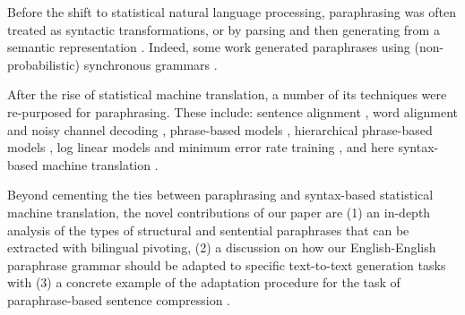 \documentclass[11pt]{article}
\begin{document}
Before the shift to statistical natural language processing,
paraphrasing was often treated as syntactic transformations, or by
parsing and then generating from a semantic representation
\cite{mckeown:1979:ACL,Muraki1982,Meteer1988,Shemtov1996,Yamamoto2002}.
Indeed, some work generated paraphrases using (non-probabilistic)
synchronous grammars
\cite{Shieber1990,Dras1997,Dras1999,Kozlowski2003}.

After the rise of statistical machine translation, a number of its
techniques were re-purposed for paraphrasing.  These include: sentence
alignment \cite{Gale1993,Barzilay2003a}, word alignment and noisy
channel decoding \cite{Brown1990,Quirk2004}, phrase-based models
\cite{Koehn2003,Callison-Burch2005}, hierarchical phrase-based models
\cite{Chiang2005,Madnani2007}, log linear models and minimum error
rate training \cite{Och2003c,Madnani2007,Zhao2008b}, and here
syntax-based machine translation
\cite{Wu1997,Yamada2001,Melamed2004,Quirk2005}.


Beyond cementing the ties between paraphrasing and syntax-based
statistical machine translation, the novel contributions of our paper
are (1) an in-depth analysis of the types of structural and sentential
paraphrases that can be extracted with bilingual pivoting, (2) a
discussion on how our English-English paraphrase grammar should be
adapted to specific text-to-text generation tasks
\cite{zhao-EtAl:2009:ACLIJCNLP2} with (3) a concrete example of the
adaptation procedure for the task of paraphrase-based sentence
compression \cite{KnightMarcuAI02,cohn-lapata:2008,Cohn2009}.





\end{document}
